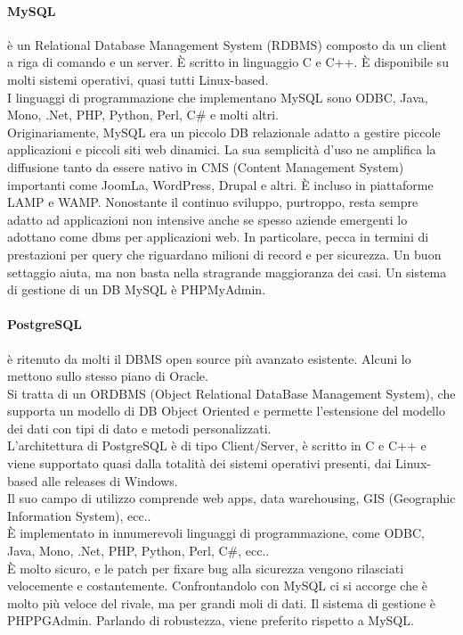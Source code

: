 \documentclass[a4paper]{report}
\begin{document}
\paragraph{MySQL} è un Relational Database Management System (RDBMS) composto da un client a riga di comando e un server. È scritto in linguaggio C e C++. È disponibile su molti sistemi operativi, quasi tutti Linux-based.\\
I linguaggi di programmazione che implementano MySQL sono ODBC, Java, Mono, .Net, PHP, Python, Perl, C\# e molti altri.\\
Originariamente, MySQL era un piccolo DB relazionale adatto a gestire piccole applicazioni e piccoli siti web dinamici. La sua semplicità d'uso ne amplifica la diffusione tanto da essere nativo in CMS (Content Management System) importanti come JoomLa, WordPress, Drupal e altri. È incluso in piattaforme LAMP e WAMP. Nonostante il continuo sviluppo, purtroppo, resta sempre adatto ad applicazioni non intensive anche se spesso aziende emergenti lo adottano come dbms per applicazioni web. In particolare, pecca in termini di prestazioni per query che riguardano milioni di record e per sicurezza. Un buon settaggio aiuta, ma non basta nella stragrande maggioranza dei casi. Un sistema di gestione di un DB MySQL è PHPMyAdmin.\\
\paragraph{PostgreSQL} è ritenuto da molti il DBMS open source più avanzato esistente. Alcuni lo mettono sullo stesso piano di Oracle.\\
Si tratta di un ORDBMS (Object Relational DataBase Management System), che supporta un modello di DB Object Oriented e permette l'estensione del modello dei dati con tipi di dato e metodi personalizzati.\\
L'architettura di PostgreSQL è di tipo Client/Server, è scritto in C e C++ e viene supportato quasi dalla totalità dei sistemi operativi presenti, dai Linux-based alle releases di Windows.\\
Il suo campo di utilizzo comprende web apps, data warehousing, GIS (Geographic Information System), ecc..\\
È implementato in innumerevoli linguaggi di programmazione, come ODBC, Java, Mono, .Net, PHP, Python, Perl, C\#, ecc..\\ 
È molto sicuro, e le patch per fixare bug alla sicurezza vengono rilasciati velocemente e costantemente. Confrontandolo con MySQL ci si accorge che è molto più veloce del rivale, ma per grandi moli di dati. Il sistema di gestione è PHPPGAdmin. Parlando di robustezza, viene preferito rispetto a MySQL.\\
\end{document}
